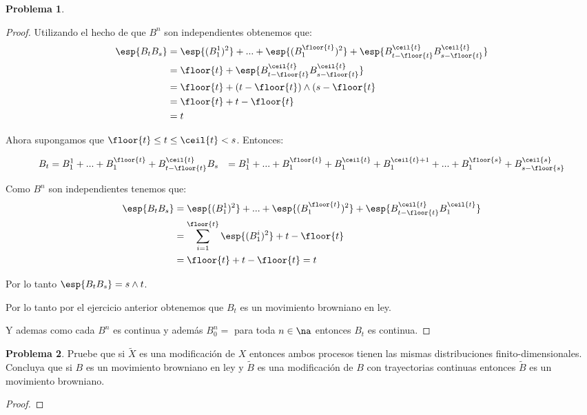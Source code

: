 \documentclass[a5paper,oneside]{amsart}
\theoremstyle{plain}
\theoremstyle{definition}
\newtheorem{problema}{Problema}
\begin{document}
\begin{problema}
\begin{enumerate}
\begin{proof}
Utilizando el hecho de que $B^n$ son independientes obtenemos que:
\begin{align}
\esp{B_tB_s}&=\esp{(B^1_1)^2}+...+\esp{(B^{\floor{t}}_1)^2}+\esp{B^{\ceil{t}}_{t-\floor{t}}B^{\ceil{t}}_{s-\floor{t}}}\notag \\
&=\floor{t}+\esp{B^{\ceil{t}}_{t-\floor{t}}B^{\ceil{t}}_{s-\floor{t}}} \notag \\
&=\floor{t}+(t-\floor{t})\wedge(s-\floor{t}\notag \\
&=\floor{t}+t-\floor{t} \notag \\
&=t\notag
\end{align}

Ahora supongamos que $\floor{t}\leq t\leq\ceil{t}< s$. Entonces:

\begin{align}
B_t&=B^1_1+...+B^{\floor{t}}_1+B^{\ceil{t}}_{t-\floor{t}}\notag
B_s&=B^1_1+...+B^{\floor{t}}_1+B^{\ceil{t}}_1+B^{\ceil{t}+1}_1+...+B^{\floor{s}}_1+B^{\ceil{s}}_{s-\floor{s}}\notag \\
\end{align}

Como $B^n$ son independientes tenemos que:
\begin{align}
\esp{B_tB_s}&=\esp{(B^1_1)^2}+...+\esp{(B^{\floor{t}}_1)^2}+\esp{B^{\ceil{t}}_{t-\floor{t}}B^{\ceil{t}}_{1} }\notag \\
&=\sum_{i=1}^{\floor{t}}\esp{(B^i_1)^2}+t-\floor{t}\notag \\
&=\floor{t}+t-\floor{t}\notag
=t\notag
\end{align}

Por lo tanto $\esp{B_tB_s}=s\wedge t$.

Por lo tanto por el ejercicio anterior obtenemos que $B_t$ es un movimiento browniano en ley.

Y ademas como cada $B^n$ es continua y adem\'as $B_0^n=$ para toda $n\in\na$ entonces $B_t$ es continua.

\end{proof}
\end{enumerate}
\end{problema}
\begin{problema}
Pruebe que si $\tilde X$ es una modificaci\'on de $X$ entonces ambos procesos tienen las mismas distribuciones finito-dimensionales. Concluya que si
 $B$ es un movimiento browniano en ley y $\tilde B$ es una modificaci\'on de $B$ con trayectorias continuas entonces $\tilde B$ es un movimiento browniano.

\begin{proof}

\end{proof}
\end{problema}
\end{document}

